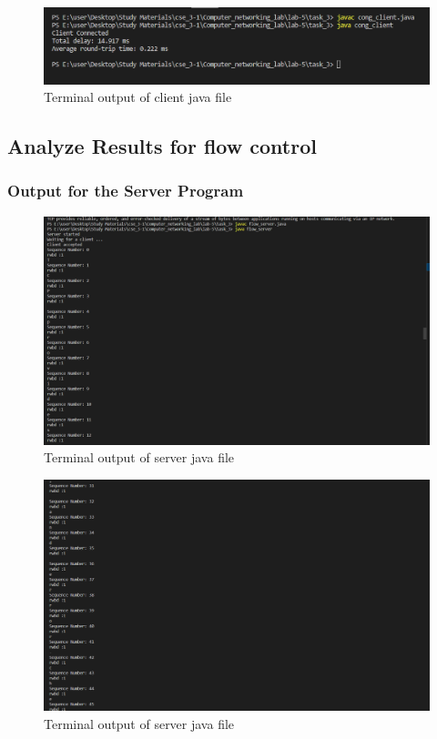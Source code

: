 \documentclass[11pt]{article}
\begin{document}
\begin{figure}[!h]
\centering
\includegraphics[width=\textwidth]{ac_client.png}
\caption{Terminal output of client java file }
\end{figure}
\FloatBarrier

 \subsection{Analyze Results for  flow control}

\subsubsection{Output for the Server Program}

 \begin{figure}[!h]
\centering
\includegraphics[width=\textwidth]{af_ser1.png}
\caption{Terminal output of server java file }
\end{figure}
\FloatBarrier

\begin{figure}[!h]
\centering
\includegraphics[width=\textwidth]{af_server2.png}
\caption{Terminal output of server java file }
\end{figure}
\FloatBarrier
\end{document}
